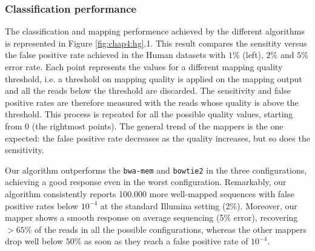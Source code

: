 \subsubsection{Classification performance}

The classification and mapping performence achieved by the different
algorithms is represented in Figure \ref{fig:chap4:hg}.1. This result
compares the sensitity versus the false positive rate achieved in the
Human datasets with $1\%$ (left), $2\%$ and $5\%$ error rate. Each
point represents the values for a different mapping quality threshold,
i.e. a threshold on mapping quality is applied on the mapping output
and all the reads below the threshold are discarded. The sensitivity
and false positive rates are therefore measured  with the reads whose
quality is above the threshold. This process is repeated for all the
possible quality values, starting from 0 (the rightmost points). The
general trend of the mappers is the one expected: the false positive
rate decreases as the quality increases, but so does the sensitivity.

Our algorithm outperforms the \texttt{bwa-mem} and \texttt{bowtie2} in
the three configurations, achieving a good response even in the worst
configuration. Remarkably, our algorithm consistently reports 100.000
more well-mapped sequences with false positive rates below $10^{-4}$
at the standard Illumina setting (2\%). Moreover, our mapper shows a
smooth response on average sequencing (5\% error), recovering $>65\%$
of the reads in all the possible configurations, whereas the other
mappers drop well below $50\%$ as soon as they reach a false positive
rate of $10^{-4}$.

